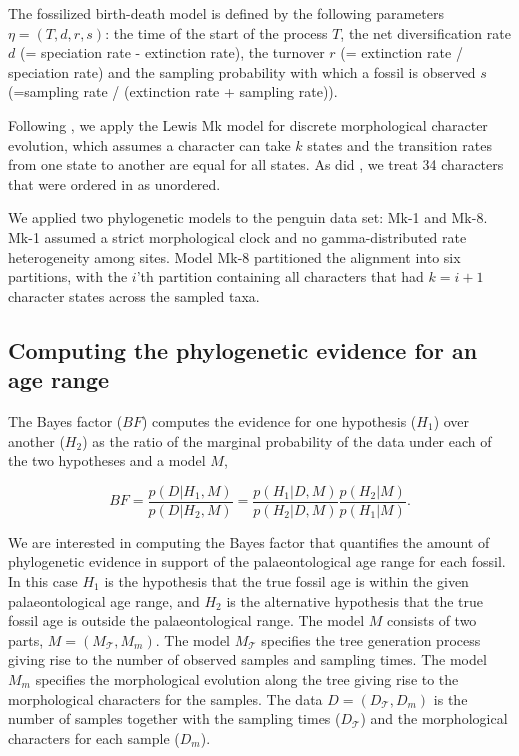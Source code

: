 \documentclass[11pt]{article}
\newcommand{\Mstrict}{{Mk-1}}
\newcommand{\Mrelaxed}{{Mk-8}}
\begin{document}
The fossilized birth-death model is defined by the following parameters $\eta=(T,d,r,s)$:  the time of the start of the process $T$, the net diversification rate $d$ (= speciation rate - extinction rate), the turnover $r$ (= extinction rate / speciation rate) and the sampling probability with which a fossil is observed $s$ (=sampling rate / (extinction rate + sampling rate)).
  
Following \cite{gavryushkina2015bayesian}, we apply the Lewis Mk model 
\cite{Lewis2001} for discrete morphological character evolution, which assumes a character can take $k$ states and the transition rates from one state to another are equal for all states. As did \cite{gavryushkina2015bayesian}, we treat 34 characters that were ordered in \cite{ksepka2012} as unordered. 

We applied two phylogenetic models to the penguin data set: \Mstrict{} and \Mrelaxed{}. \Mstrict{} assumed a strict morphological clock and no gamma-distributed rate heterogeneity among sites. Model \Mrelaxed{} partitioned the alignment into six partitions, with the $i$'th partition containing all characters that had $k=i+1$ character states across the sampled taxa.

\subsection*{Computing the phylogenetic evidence for an age range}

The Bayes factor ($BF$) computes the evidence for one hypothesis ($H_1$) over another ($H_2$) as the ratio of the marginal probability of the data under each of the two hypotheses and a model $M$, 

\begin{equation}
BF = \frac{p(D|H_1,M)}{p(D|H_2,M)} = \frac{p(H_1|D,M)}{p(H_2|D,M)}\frac{p(H_2|M)}{p(H_1|M)}.
\end{equation}

We are interested in computing the Bayes factor that quantifies the amount of phylogenetic evidence in support of the palaeontological age range for each fossil. In this case $H_1$ is the hypothesis that the true fossil age is within the given palaeontological age range, and $H_2$ is the alternative hypothesis that the true fossil age is outside the palaeontological range. 
The model $M$ consists of two parts, $M=(M_\mathcal{T},M_m)$. The model $M_\mathcal{T}$ specifies the tree generation process  giving rise to the number of observed samples and sampling times. The model $M_m$ specifies the morphological evolution along the tree giving rise to the morphological characters for the samples. The data $D=(D_\mathcal{T},D_m)$ is the number of samples together with the sampling times ($D_\mathcal{T}$) and  the morphological characters for each sample ($D_m$). 
\end{document}
